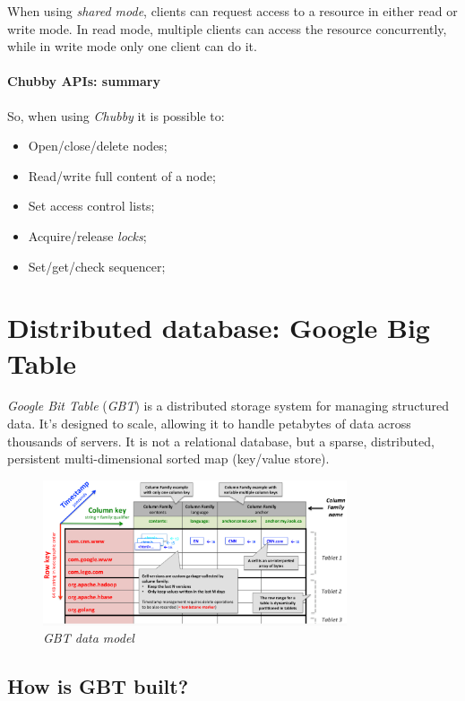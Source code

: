 \noindent
When using \emph{shared mode}, clients can request access to a resource in either
read or write mode. In read mode, multiple clients can access the resource
concurrently, while in write mode only one client can do it.

\paragraph{Chubby APIs: summary}
So, when using \emph{Chubby} it is possible to:
\begin{itemize}
    \item Open/close/delete nodes;
    \item Read/write full content of a node;
    \item Set access control lists;
    \item Acquire/release \emph{locks};
    \item Set/get/check sequencer;
\end{itemize}

\section{Distributed database: Google Big Table}
\emph{Google Bit Table} (\emph{GBT}) is a distributed storage system for
managing structured data. It's designed to scale, allowing it to handle petabytes
of data across thousands of servers. It is not a relational database, but a
sparse, distributed, persistent multi-dimensional sorted map (key/value store).

\begin{figure}[h!]
    \centering
    \includegraphics[width=0.8\textwidth]{images/gbt-design.png}
    \caption{\emph{GBT data model}}
\end{figure}

\subsection{How is GBT built?}

